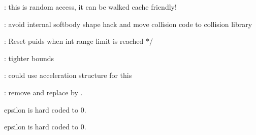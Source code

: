 \begin{DoxyRefList}
\label{todo__todo000036}%
%
\+: this is random access, it can be walked \textquotesingle{}cache friendly\textquotesingle{}!  
\item[Member \doxylink{classbt_soft_body_aced0f5421eeb1491a3fd77bb91e2e5af}{bt\+Soft\+Body\+::set\+Collision\+Shape} (bt\+Collision\+Shape \texorpdfstring{$\ast$}{*}collision\+Shape)]\label{todo__todo000039}%
%
\+: avoid internal softbody shape hack and move collision code to collision library  
\item[Member \doxylink{structbt_sparse_sdf_a08dbaa356f577ebbd0808329766111d1}{bt\+Sparse\+Sdf\texorpdfstring{$<$}{<} CELLSIZE \texorpdfstring{$>$}{>}\+::Garbage\+Collect} (int lifetime=256)]\label{todo__todo000040}%
%
\+: Reset puid\textquotesingle{}s when int range limit is reached \texorpdfstring{$\ast$}{*}/  
\item[Member \doxylink{classbt_sphere_triangle_collision_algorithm_af6de517d0a45abb91df4f61c5867c8f1}{bt\+Sphere\+Triangle\+Collision\+Algorithm\+::process\+Collision} (const \doxylink{structbt_collision_object_wrapper}{bt\+Collision\+Object\+Wrapper} \texorpdfstring{$\ast$}{*}body0\+Wrap, const \doxylink{structbt_collision_object_wrapper}{bt\+Collision\+Object\+Wrapper} \texorpdfstring{$\ast$}{*}body1\+Wrap, const \doxylink{structbt_dispatcher_info}{bt\+Dispatcher\+Info} \&dispatch\+Info, \doxylink{classbt_manifold_result}{bt\+Manifold\+Result} \texorpdfstring{$\ast$}{*}result\+Out)]\label{todo__todo000018}%
%
\+: tighter bounds  
\item[Member \doxylink{classbt_triangle_mesh_a3b521a1faa5862a818d9f983230749a2}{bt\+Triangle\+Mesh\+::find\+Or\+Add\+Vertex} (const bt\+Vector3 \&vertex, bool remove\+Duplicate\+Vertices)]\label{todo__todo000024}%
%
\+: could use acceleration structure for this  
\item[Class \doxylink{class_g_i_m___c_o_n_t_a_c_t}{GIM\+\_\+\+CONTACT} ]\label{todo__todo000025}%
%
\+: remove and replace  by .  
\item[Member \doxylink{group__gtx__vector__angle_ga9556a803dce87fe0f42fdabe4ebba1d5}{glm\+::oriented\+Angle} (\doxylink{structglm_1_1vec_3_012_00_01_t_00_01_q_01_4}{vec$<$ 2, T, Q $>$} const \&x, \doxylink{structglm_1_1vec_3_012_00_01_t_00_01_q_01_4}{vec$<$ 2, T, Q $>$} const \&y)]\label{todo__todo000045}%
%
epsilon is hard coded to 0.  
\item[Member \doxylink{group__gtx__vector__angle_ga82a19d474be13c92c7b10caab42a5a72}{glm\+::oriented\+Angle} (tvec2$<$ T, P $>$ const \&x, tvec2$<$ T, P $>$ const \&y)]\label{todo__todo000046}%
%
epsilon is hard coded to 0. 
\end{DoxyRefList}